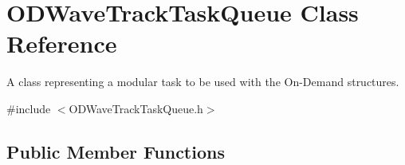 \hypertarget{class_o_d_wave_track_task_queue}{}\section{O\+D\+Wave\+Track\+Task\+Queue Class Reference}
\label{class_o_d_wave_track_task_queue}


A class representing a modular task to be used with the On-\/\+Demand structures.  




{\ttfamily \#include $<$O\+D\+Wave\+Track\+Task\+Queue.\+h$>$}

\subsection*{Public Member Functions}
